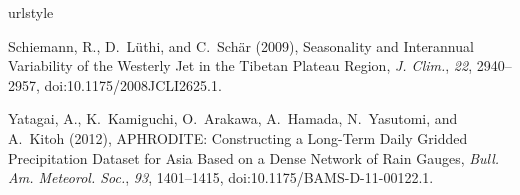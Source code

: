 \documentclass[final,grl]{agutexSI}
\begin{document}
\begin{thebibliography}{2}
\providecommand{\natexlab}[1]{#1}
\expandafter\ifx\csname urlstyle\endcsname\relax
  \providecommand{\doi}[1]{doi:\discretionary{}{}{}#1}\else
  \providecommand{\doi}{doi:\discretionary{}{}{}\begingroup
  \urlstyle{rm}\Url}\fi

Schiemann, R., D.~L\"{u}thi, and C.~Sch\"{a}r (2009), {Seasonality and
  Interannual Variability of the Westerly Jet in the Tibetan Plateau Region},
  \textit{J. Clim.}, \textit{22}, 2940--2957, \doi{10.1175/2008JCLI2625.1}.

Yatagai, A., K.~Kamiguchi, O.~Arakawa, A.~Hamada, N.~Yasutomi, and A.~Kitoh
  (2012), {APHRODITE: Constructing a Long-Term Daily Gridded Precipitation
  Dataset for Asia Based on a Dense Network of Rain Gauges}, \textit{Bull. Am.
  Meteorol. Soc.}, \textit{93}, 1401--1415, \doi{10.1175/BAMS-D-11-00122.1}.

\end{thebibliography}
\end{document}
